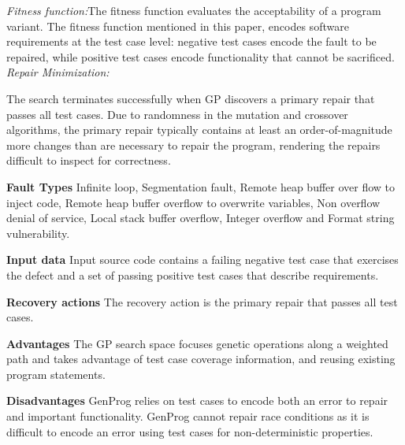 \begin{compactitem}
\textit{Fitness function:}The fitness function evaluates the acceptability of a program variant. The fitness function mentioned in this paper, encodes software requirements at the test case level: negative test cases encode the fault to be repaired, while positive test cases encode functionality that cannot be sacrificed.\\

\textit{Repair Minimization:}

The search terminates successfully when GP discovers a primary repair that passes all test cases. Due to randomness in the mutation and crossover algorithms, the primary repair typically contains at least an order-of-magnitude more changes than are necessary to repair the program, rendering the repairs difficult to inspect for correctness.


\item[\textbf{Fault Types}]Infinite loop, Segmentation fault, Remote heap buffer over flow to inject code, Remote heap buffer overflow to overwrite variables, Non overflow denial of service, Local stack buffer overflow, Integer overflow and Format string vulnerability.

\item[\textbf{Input data}] Input source code contains a failing negative test case that exercises the defect and a set of passing positive test cases that describe requirements.

\item[\textbf{Recovery actions}]The recovery action is the primary repair that passes all test cases.

\item[\textbf{Advantages}] 
The GP search space focuses genetic operations along a weighted path and takes advantage of test case coverage information, and reusing existing program statements.

\item[\textbf{Disadvantages}] GenProg relies on test cases to encode both an error to repair and important functionality. GenProg cannot repair race conditions as it is difficult to encode an error using test cases for non-deterministic properties.


\end{compactitem}



